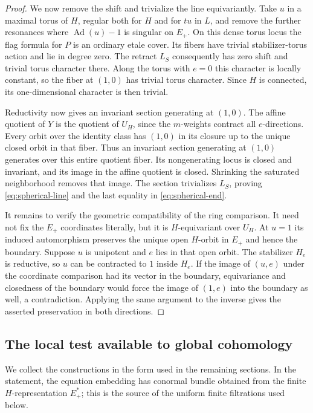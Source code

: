 \documentclass[11pt]{article}
\numberwithin{equation}{section}
\theoremstyle{definition}
\theoremstyle{remark}
\newcommand{\Ad}{\operatorname{Ad}}
\begin{document}
\begin{proof}
We now remove the shift and trivialize the line equivariantly.
Take $u$ in a maximal torus of $H$, regular both for $H$ and for $tu$
in $L$, and remove the further resonances where
$\Ad(u)-1$ is singular on $E_+$.  On this dense torus locus the
flag formula for $P$ is an ordinary etale cover.  Its fibers have
trivial stabilizer-torus action and lie in degree zero.  The retract
$L_S$ consequently has zero shift and trivial torus character there.
Along the torus with $e=0$ this character is locally constant, so the
fiber at $(1,0)$ has trivial torus character.  Since $H$ is connected,
its one-dimensional character is then trivial.

Reductivity now gives an invariant section generating at $(1,0)$.
The affine quotient of $Y$ is the quotient of $U_H$, since the
$m$-weights contract all $e$-directions.  Every orbit over the identity
class has $(1,0)$ in its closure up to the unique closed orbit in that
fiber.  Thus an invariant section generating at $(1,0)$ generates
over this entire quotient fiber.  Its nongenerating locus is closed
and invariant, and its image in the affine quotient is closed.
Shrinking the saturated neighborhood removes that image.  The
section trivializes $L_S$, proving \eqref{eq:spherical-line} and the
last equality in \eqref{eq:spherical-end}.

It remains to verify the geometric compatibility of the ring
comparison.  It need not fix the $E_+$ coordinates literally,
but it is $H$-equivariant over $U_H$.  At $u=1$ its induced
automorphism preserves the unique open $H$-orbit in $E_+$ and hence
the boundary.  Suppose $u$ is unipotent and $e$ lies in that open
orbit.  The stabilizer $H_e$ is reductive, so $u$ can be contracted
to $1$ inside $H_e$.  If the image of $(u,e)$ under the coordinate
comparison had its vector in the boundary, equivariance and closedness
of the boundary would force the image of $(1,e)$ into the boundary
as well, a contradiction.  Applying the same argument to the inverse
gives the asserted preservation in both directions.
\end{proof}

\subsection{The local test available to global cohomology}

We collect the constructions in the form used in the remaining
sections.  In the statement, the equation embedding has conormal
bundle obtained from the finite $H$-representation $E_+^*$; this is
the source of the uniform finite filtrations used below.
\end{document}
